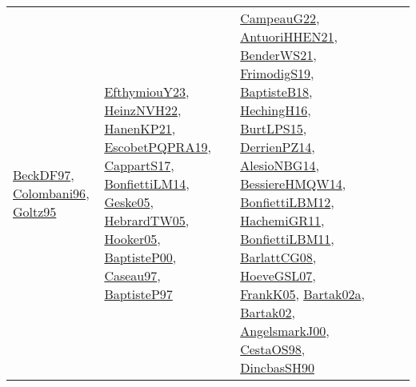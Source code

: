 {\begin{longtable}{lp{3cm}>{\raggedright}p{6cm}>{\raggedright}p{6cm}p{8cm}}
\href{papers/BeckDF97.pdf}{BeckDF97}\cite{BeckDF97}, \href{papers/Colombani96.pdf}{Colombani96}\cite{Colombani96}, \href{papers/Goltz95.pdf}{Goltz95}\cite{Goltz95} & \href{papers/EfthymiouY23.pdf}{EfthymiouY23}\cite{EfthymiouY23}, \href{articles/HeinzNVH22.pdf}{HeinzNVH22}\cite{HeinzNVH22}, \href{papers/HanenKP21.pdf}{HanenKP21}\cite{HanenKP21}, \href{articles/EscobetPQPRA19.pdf}{EscobetPQPRA19}\cite{EscobetPQPRA19}, \href{papers/CappartS17.pdf}{CappartS17}\cite{CappartS17}, \href{papers/BonfiettiLM14.pdf}{BonfiettiLM14}\cite{BonfiettiLM14}, \href{papers/Geske05.pdf}{Geske05}\cite{Geske05}, \href{papers/HebrardTW05.pdf}{HebrardTW05}\cite{HebrardTW05}, \href{articles/Hooker05.pdf}{Hooker05}\cite{Hooker05}, \href{articles/BaptisteP00.pdf}{BaptisteP00}\cite{BaptisteP00}, \href{papers/Caseau97.pdf}{Caseau97}\cite{Caseau97}, \href{papers/BaptisteP97.pdf}{BaptisteP97}\cite{BaptisteP97} & \href{articles/CampeauG22.pdf}{CampeauG22}\cite{CampeauG22}, \href{papers/AntuoriHHEN21.pdf}{AntuoriHHEN21}\cite{AntuoriHHEN21}, \href{papers/BenderWS21.pdf}{BenderWS21}\cite{BenderWS21}, \href{papers/FrimodigS19.pdf}{FrimodigS19}\cite{FrimodigS19}, \href{articles/BaptisteB18.pdf}{BaptisteB18}\cite{BaptisteB18}, \href{papers/HechingH16.pdf}{HechingH16}\cite{HechingH16}, \href{papers/BurtLPS15.pdf}{BurtLPS15}\cite{BurtLPS15}, \href{papers/DerrienPZ14.pdf}{DerrienPZ14}\cite{DerrienPZ14}, \href{papers/AlesioNBG14.pdf}{AlesioNBG14}\cite{AlesioNBG14}, \href{papers/BessiereHMQW14.pdf}{BessiereHMQW14}\cite{BessiereHMQW14}, \href{papers/BonfiettiLBM12.pdf}{BonfiettiLBM12}\cite{BonfiettiLBM12}, \href{articles/HachemiGR11.pdf}{HachemiGR11}\cite{HachemiGR11}, \href{papers/BonfiettiLBM11.pdf}{BonfiettiLBM11}\cite{BonfiettiLBM11}, \href{papers/BarlattCG08.pdf}{BarlattCG08}\cite{BarlattCG08}, \href{papers/HoeveGSL07.pdf}{HoeveGSL07}\cite{HoeveGSL07}, \href{papers/FrankK05.pdf}{FrankK05}\cite{FrankK05}, \href{papers/Bartak02a.pdf}{Bartak02a}\cite{Bartak02a}, \href{papers/Bartak02.pdf}{Bartak02}\cite{Bartak02}, \href{papers/AngelsmarkJ00.pdf}{AngelsmarkJ00}\cite{AngelsmarkJ00}, \href{papers/CestaOS98.pdf}{CestaOS98}\cite{CestaOS98}, \href{articles/DincbasSH90.pdf}{DincbasSH90}\cite{DincbasSH90}\\

\end{longtable}}
